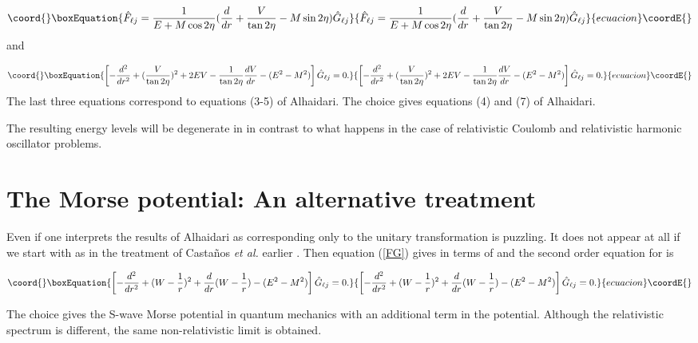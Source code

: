 \documentclass[a4paper,dvips,12pt]{article}
\begin{document}
\begin{equation}\coord{}\boxEquation{
\label{FG}
\hat F_{\ell j}={1\over {E+M\cos 2\eta}}({d\over dr}+{V\over \tan 2\eta}-
M\sin 2\eta)\hat G_{\ell j}
}{
\hat F_{\ell j}={1\over {E+M\cos 2\eta}}({d\over dr}+{V\over \tan 2\eta}-
M\sin 2\eta)\hat G_{\ell j}
}{ecuacion}\coordE{}\end{equation}
and

\begin{equation}\coord{}\boxEquation{
\left[-{d^2\over dr^2}+({V\over \tan 2\eta})^2+2EV-
{1\over \tan 2\eta}{dV\over dr}-
(E^2-M^2)\right]\hat G_{\ell j}=0.
}{
\left[-{d^2\over dr^2}+({V\over \tan 2\eta})^2+2EV-
{1\over \tan 2\eta}{dV\over dr}-
(E^2-M^2)\right]\hat G_{\ell j}=0.
}{ecuacion}\coordE{}\end{equation}
The last three equations correspond to equations (3-5) of Alhaidari.
The choice \coordHE{} gives equations (4) and (7) of
Alhaidari.

The resulting energy levels will be degenerate in \coordHE{}
in contrast to what happens in the case of relativistic Coulomb and
relativistic harmonic oscillator problems.

\section{The Morse potential: An alternative treatment}


Even if  one interprets the results of Alhaidari as
corresponding only to \coordHE{} the unitary transformation
is puzzling. It does not appear at all if we start with \coordHE{} as in the
treatment of Casta\~nos {\it et al.} earlier  \cite{Cas91}. Then equation
(\ref{FG}) gives \coordHE{} in terms of \coordHE{} and the second order equation for
 \coordHE{} is


\begin{equation}\coord{}\boxEquation{
\left[-{d^2\over dr^2}+(W-{1\over r})^2+\frac{d}{dr}(W-{1\over r})
-(E^2-M^2)\right]\hat G_{\ell j}=0.
}{
\left[-{d^2\over dr^2}+(W-{1\over r})^2+\frac{d}{dr}(W-{1\over r})
-(E^2-M^2)\right]\hat G_{\ell j}=0.
}{ecuacion}\coordE{}\end{equation}

The  choice  \coordHE{}
gives the S-wave Morse potential in quantum mechanics
with an additional \coordHE{} term in the potential.
Although the relativistic spectrum is different,
the same non-relativistic limit is obtained.
\end{document}
